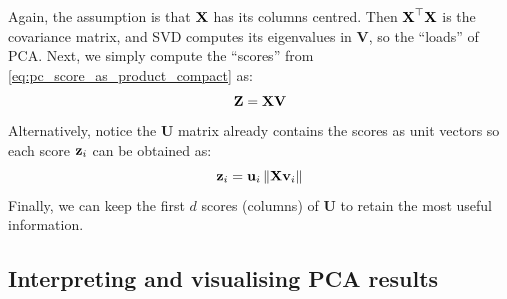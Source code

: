 \documentclass[a4paper]{article}
\begin{document}
Again, the assumption is that $\textbf{X}$ has its columns centred. Then $\textbf{X}^{\top}\textbf{X}$ is the covariance matrix, and SVD computes its eigenvalues in $\textbf{V}$, so the ``loads'' of PCA. Next, we simply compute the ``scores'' from \eqref{eq:pc_score_as_product_compact} as:
\begin{equation}
    \textbf{Z} = \textbf{X}\textbf{V}
\end{equation}
Alternatively, notice the $\textbf{U}$ matrix already contains the scores as unit vectors so each score $\textbf{z}_i$ can be obtained as:
\begin{equation}
    \textbf{z}_i = \textbf{u}_i \left\lVert\textbf{X}\textbf{v}_i\right\rVert
\end{equation}
Finally, we can keep the first $d$ scores (columns) of $\textbf{U}$ to retain the most useful information.



\subsection{Interpreting and visualising PCA results}
\end{document}
